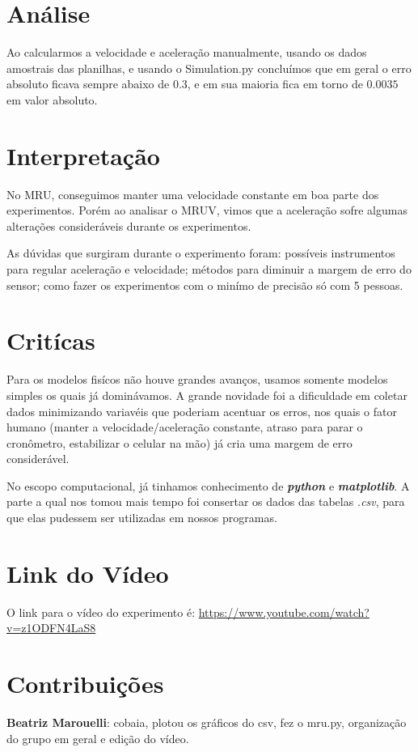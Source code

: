 \documentclass[a4paper, 12pt]{article}
\begin{document}
\section*{Análise}
Ao calcularmos a velocidade e aceleração manualmente, usando os dados amostrais
das planilhas, e usando o Simulation.py concluímos que em geral o erro absoluto
ficava sempre abaixo de $0.3$, e em sua maioria fica em torno de $0.0035$ em
valor absoluto.

\section*{Interpretação}
No MRU, conseguimos manter uma velocidade constante em boa parte dos experimentos.
Porém ao analisar o MRUV, vimos que a aceleração sofre algumas alterações
consideráveis durante os experimentos.

As dúvidas que surgiram durante o experimento foram: possíveis instrumentos para
regular aceleração e velocidade; métodos para diminuir a margem de erro do
sensor; como fazer os experimentos com o minímo de precisão só com 5 pessoas.

\section*{Critícas}
Para os modelos fisícos não houve grandes avanços, usamos somente modelos
simples os quais já dominávamos. A grande novidade foi a dificuldade em coletar
dados minimizando variavéis que poderiam acentuar os erros, nos quais o fator
humano (manter a velocidade/aceleração constante, atraso para parar o
cronômetro, estabilizar o celular na mão) já cria uma margem de erro considerável. 

No escopo computacional, já tinhamos conhecimento de \textit{\textbf{python}} e
\textit{\textbf{matplotlib}}. A parte a qual nos tomou mais tempo foi consertar
os dados das tabelas \textit{.csv}, para que elas pudessem ser utilizadas em
nossos programas.

\section*{Link do Vídeo}
O link para o vídeo do experimento é:
\url{https://www.youtube.com/watch?v=z1ODFN4LaS8}

\section*{Contribuições}
\textbf{Beatriz Marouelli}: cobaia, plotou os gráficos do csv, 
fez o mru.py, organização do grupo em geral e edição do vídeo.
\end{document}
